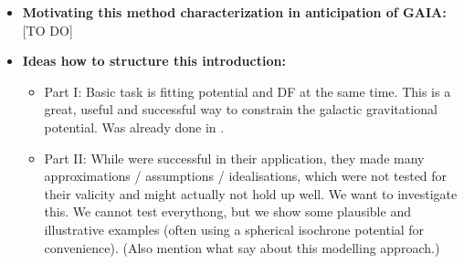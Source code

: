 \begin{itemize}
\item \textbf{Motivating this method characterization in anticipation of GAIA:} [TO DO]


\item \textbf{Ideas how to structure this introduction:}
\begin{itemize}
\item Part I: Basic task is fitting potential and DF at the same time. This is a great, useful and successful way to constrain the galactic gravitational potential. Was already done in \citet{bov13}.
\item Part II: While \citet{bov13} were successful in their application, they made many approximations / assumptions / idealisations, which were not tested for their valicity and might actually not hold up well. We want to investigate this. We cannot test everythong, but we show some plausible and illustrative examples (often using a spherical isochrone potential for convenience). (Also mention what \citet{san15} say about this modelling approach.) 
\end{itemize}

\end{itemize}
